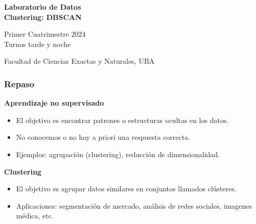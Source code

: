 \documentclass[aspectratio=169,12pt]{beamer}
\begin{document}

\begin{frame}

 \begin{center}

\Large\textbf{Laboratorio de Datos} \\
\large\textbf{Clustering: DBSCAN}




\vspace{1cm}
Primer Cuatrimestre 2024 \\ Turnos tarde y noche

\vspace{1cm}


 {\small Facultad de Ciencias Exactas y Naturales, UBA}
 \end{center}


\end{frame}


\begin{frame}
\frametitle{Repaso}

\textbf{Aprendizaje no supervisado}
\begin{itemize}
    \item El objetivo es encontrar patrones o estructuras ocultas en los datos.
    \item No conocemos o no hay a priori una respuesta correcta.
    \item Ejemplos: agrupación (clustering), reducción de dimensionalidad.
\end{itemize}

\textbf{Clustering}
\begin{itemize}
\item El objetivo es agrupar datos similares en conjuntos llamados clústeres.
\item Aplicaciones: segmentación de mercado, análisis de redes sociales, imagenes médica, etc.
\end{itemize}

\end{frame}
\end{document}
